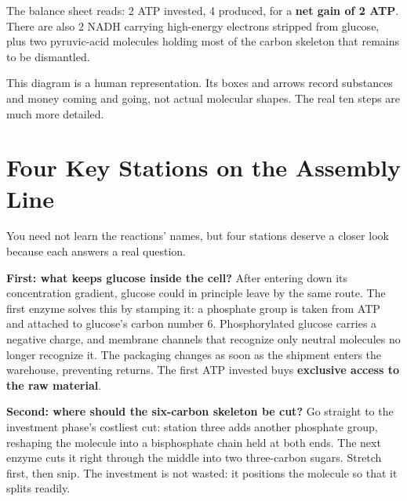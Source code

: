 The balance sheet reads: 2 ATP invested, 4 produced, for a \textbf{net gain of 2 ATP}. There are also 2 NADH carrying high-energy electrons stripped from glucose, plus two pyruvic-acid molecules holding most of the carbon skeleton that remains to be dismantled.

\begin{center}
\end{center}

This diagram is a human representation. Its boxes and arrows record substances and money coming and going, not actual molecular shapes. The real ten steps are much more detailed.

\section{Four Key Stations on the Assembly Line}

You need not learn the reactions' names, but four stations deserve a closer look because each answers a real question.

\textbf{First: what keeps glucose inside the cell?} After entering down its concentration gradient, glucose could in principle leave by the same route. The first enzyme solves this by stamping it: a phosphate group is taken from ATP and attached to glucose's carbon number 6. Phosphorylated glucose carries a negative charge, and membrane channels that recognize only neutral molecules no longer recognize it. The packaging changes as soon as the shipment enters the warehouse, preventing returns. The first ATP invested buys \textbf{exclusive access to the raw material}.

\textbf{Second: where should the six-carbon skeleton be cut?} Go straight to the investment phase's costliest cut: station three adds another phosphate group, reshaping the molecule into a bisphosphate chain held at both ends. The next enzyme cuts it right through the middle into two three-carbon sugars. Stretch first, then snip. The investment is not wasted: it positions the molecule so that it splits readily.

